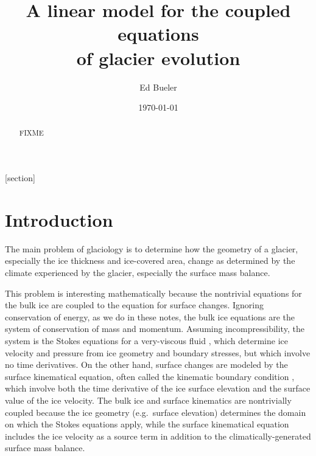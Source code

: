 \documentclass[letterpaper,final,12pt,reqno]{amsart}
\theoremstyle{cstyle}
\theoremstyle{cstyle*}
\theoremstyle{dstyle}
\begin{document}
\title[A linear model for the coupled equations of glacier evolution]{A linear model for the coupled equations \\ of glacier evolution}

\author{Ed Bueler}

\date{\today}

\begin{abstract} FIXME
\end{abstract}

\maketitle


\thispagestyle{empty}

[section]


\section{Introduction} \label{sec:intro}

The main problem of glaciology is to determine how the geometry of a glacier, especially the ice thickness and ice-covered area, change as determined by the climate experienced by the glacier, especially the surface mass balance.

This problem is interesting mathematically because the nontrivial equations for the bulk ice are coupled to the equation for surface changes.  Ignoring conservation of energy, as we do in these notes, the bulk ice equations are the system of conservation of mass and momentum.  Assuming incompressibility, the system is the Stokes equations for a very-viscous fluid \cite{Elmanetal2014,GreveBlatter2009}, which determine ice velocity and pressure from ice geometry and boundary stresses, but which involve no time derivatives.  On the other hand, surface changes are modeled by the surface kinematical equation, often called the kinematic boundary condition \cite{GreveBlatter2009}, which involve both the time derivative of the ice surface elevation and the surface value of the ice velocity.  The bulk ice and surface kinematics are nontrivially coupled because the ice geometry (e.g.~surface elevation) determines the domain on which the Stokes equations apply, while the surface kinematical equation includes the ice velocity as a source term in addition to the climatically-generated surface mass balance.
\end{document}
